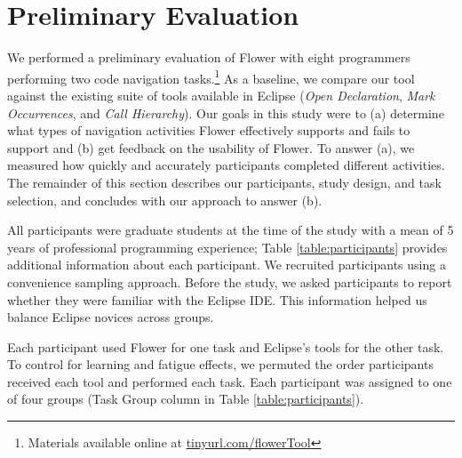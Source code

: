 \documentclass[conference]{IEEEtran}
\begin{document}


\section{Preliminary Evaluation}
We performed a preliminary evaluation of Flower with eight programmers performing two code navigation tasks.\footnote{Materials available online at \url{tinyurl.com/flowerTool}}
As a baseline, we compare our tool against the existing suite of tools available in Eclipse (\emph{Open Declaration}, \emph{Mark Occurrences}, and \emph{Call Hierarchy}).
Our goals in this study were to (a) determine what types of navigation activities Flower  effectively supports and fails to support and (b) get feedback on the usability of Flower.
To answer (a), we measured how quickly and accurately participants completed different activities.
The remainder of this section describes our participants, study design, and task selection, and concludes with our approach to answer (b).

All participants were graduate students at the time of the study with a mean of 5 years of professional programming experience; Table \ref{table:participants} provides additional information about each participant. We recruited participants using a convenience sampling approach. 
Before the study, we asked participants to report whether they were familiar with the Eclipse IDE. This information helped us balance Eclipse novices across groups.

Each participant used Flower for one task and Eclipse's tools for the other task.
To control for learning and fatigue effects, we permuted the order participants received each tool and performed each task. 
Each participant was assigned to one of four groups (Task Group column in Table \ref{table:participants}).
\end{document}
